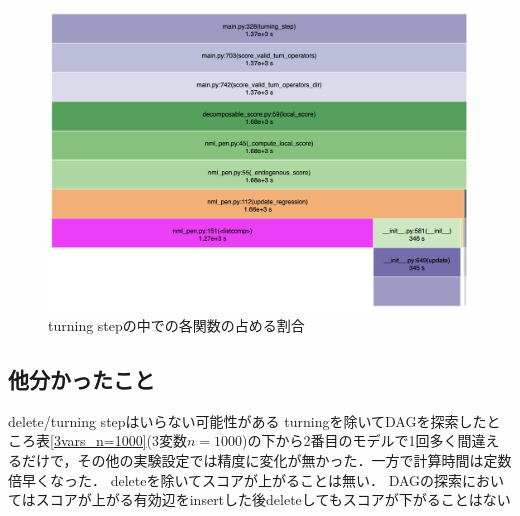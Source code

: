 \documentclass[dvipdfmx]{jsarticle}
\begin{document}
\begin{figure}[t]
 \begin{center}
  \includegraphics[width=0.8\linewidth,angle=0]{images/report1/report1_2.png}
  \caption{turning stepの中での各関数の占める割合 \label{fig:bottleneck_2}}
 \end{center}
\end{figure}

\subsection{他分かったこと}
\begin{outline}
\1 delete/turning stepはいらない可能性がある
    \2 turningを除いてDAGを探索したところ表\ref{3vars_n=1000}(3変数$n=1000$)の下から2番目のモデルで1回多く間違えるだけで，その他の実験設定では精度に変化が無かった．一方で計算時間は定数倍早くなった．
\1 deleteを除いてスコアが上がることは無い．
    \2 DAGの探索においてはスコアが上がる有効辺をinsertした後deleteしてもスコアが下がることはない
  
\end{outline}




\end{document}
